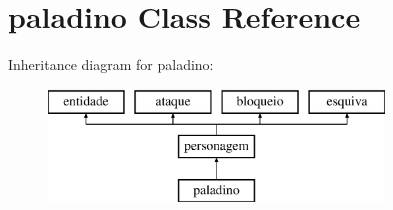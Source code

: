 \hypertarget{classpaladino}{}\section{paladino Class Reference}
\label{classpaladino}
Inheritance diagram for paladino\+:\begin{figure}[H]
\begin{center}
\leavevmode
\includegraphics[height=3.000000cm]{classpaladino}
\end{center}
\end{figure}
